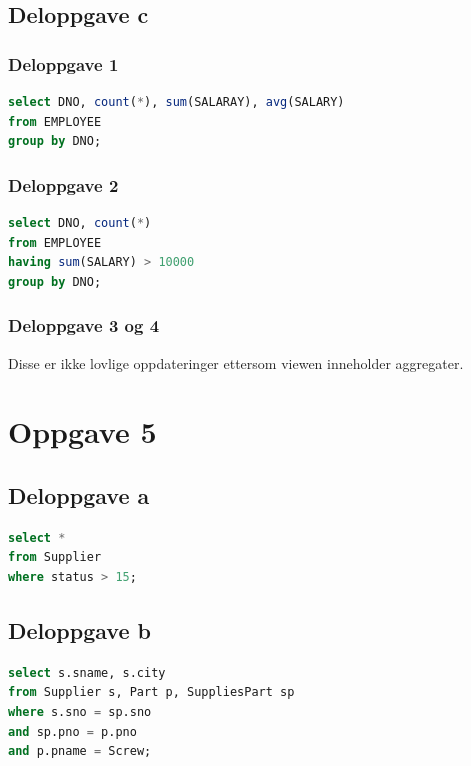 \documentclass[a4paper, 12pt] {article}
\begin{document}
\subsection{Deloppgave c}

\subsubsection{Deloppgave 1}

\begin{lstlisting}[language=SQL, label=oppg4c1, caption=Oppgave 4c1]
select DNO, count(*), sum(SALARAY), avg(SALARY)
from EMPLOYEE
group by DNO;
\end{lstlisting}

\subsubsection{Deloppgave 2}

\begin{lstlisting}[language=SQL, label=oppg4c2, caption=Oppgave 4c2]
select DNO, count(*)
from EMPLOYEE
having sum(SALARY) > 10000
group by DNO;
\end{lstlisting}

\subsubsection{Deloppgave 3 og 4}

Disse er ikke lovlige oppdateringer ettersom viewen inneholder aggregater.

\newpage
\section{Oppgave 5}

\subsection{Deloppgave a}

\begin{lstlisting}[language=SQL, label=oppg5a, caption=Oppgave 5a]
select * 
from Supplier
where status > 15;
\end{lstlisting}

\subsection{Deloppgave b}

\begin{lstlisting}[language=SQL, label=oppg5b, caption=Oppgave 5b]
select s.sname, s.city 
from Supplier s, Part p, SuppliesPart sp
where s.sno = sp.sno 
and sp.pno = p.pno 
and p.pname = Screw;
\end{lstlisting}
\end{document}
